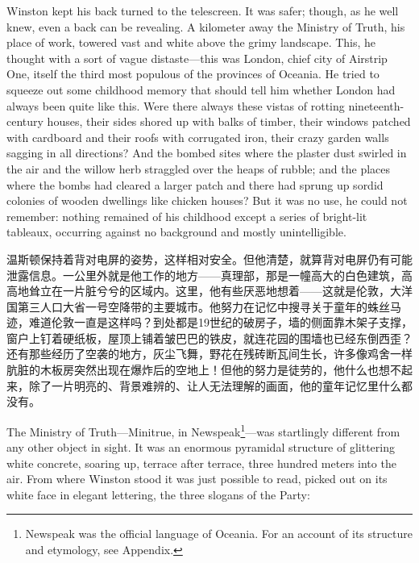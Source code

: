 \begin{paracol}{2}
Winston kept his back turned to the telescreen. It was safer; though, as
he well knew, even a back can be revealing. A kilometer away the
Ministry of Truth, his place of work, towered vast and white above the
grimy landscape. This, he thought with a sort of vague distaste---this
was London, chief city of Airstrip One, itself the third most populous
of the provinces of Oceania. He tried to squeeze out some childhood
memory that should tell him whether London had always been quite like
this. Were there always these vistas of rotting nineteenth-century
houses, their sides shored up with balks of timber, their windows
patched with cardboard and their roofs with corrugated iron, their crazy
garden walls sagging in all directions? And the bombed sites where the
plaster dust swirled in the air and the willow herb straggled over the
heaps of rubble; and the places where the bombs had cleared a larger
patch and there had sprung up sordid colonies of wooden dwellings like
chicken houses? But it was no use, he could not remember: nothing
remained of his childhood except a series of bright-lit tableaux,
occurring against no background and mostly unintelligible.

\switchcolumn

温斯顿保持着背对电屏的姿势，这样相对安全。但他清楚，就算背对电屏仍有可能泄露信息。一公里外就是他工作的地方——真理部，那是一幢高大的白色建筑，高高地耸立在一片脏兮兮的区域内。这里，他有些厌恶地想着——这就是伦敦，大洋国第三人口大省一号空降带的主要城市。他努力在记忆中搜寻关于童年的蛛丝马迹，难道伦敦一直是这样吗？到处都是19世纪的破房子，墙的侧面靠木架子支撑，窗户上钉着硬纸板，屋顶上铺着皱巴巴的铁皮，就连花园的围墙也已经东倒西歪？还有那些经历了空袭的地方，灰尘飞舞，野花在残砖断瓦间生长，许多像鸡舍一样肮脏的木板房突然出现在爆炸后的空地上！但他的努力是徒劳的，他什么也想不起来，除了一片明亮的、背景难辨的、让人无法理解的画面，他的童年记忆里什么都没有。

\switchcolumn*

The Ministry of Truth---Minitrue, in Newspeak\footnote{Newspeak was the
  official language of Oceania. For an account of its structure and
  etymology, see Appendix.}---was startlingly different from any other
object in sight. It was an enormous pyramidal structure of glittering white
concrete, soaring up, terrace after terrace, three hundred meters into the
air. From where Winston stood it was just possible to read, picked out on
its white face in elegant lettering, the three slogans of the Party:

\switchcolumn


\end{paracol}
